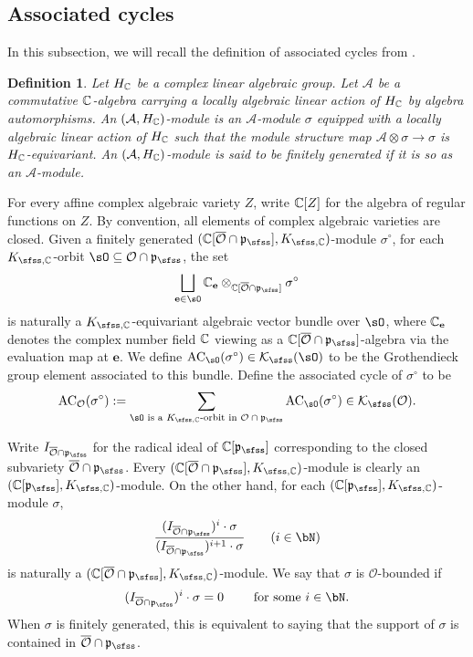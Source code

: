 \documentclass[11pt,a4paper]{amsart}
\newcommand{\CA}{{\mathcal {A}}}
\newcommand{\CK}{{\mathcal {K}}}
\newcommand{\CO}{{\mathcal {O}}}
\newcommand{\p}{\mathfrak p}
\numberwithin{equation}{section}
\newtheorem{defn}[thm]{Definition}
\theoremstyle{remark}
\def\subset{\subseteq}
\begin{document}
\subsection{Associated cycles}

In this subsection, we will recall the definition of associated cycles from \cite{Vo89}.
\begin{defn}\label{spkmodule}
 Let $H_{\mathbb{C}}$ be a complex linear algebraic group. Let $\CA$ be a commutative $\mathbb{C}$-algebra carrying a locally algebraic linear action of $H_{\mathbb{C}}$ by algebra automorphisms.
  An $(\CA, H_\C)$-module is an  $\CA$-module
$
  \sigma
$
equipped with a locally algebraic linear action of $H_{\mathbb{C}}$ such that
the module structure map
$
  \CA\otimes \sigma\rightarrow \sigma
$
is $H_{\mathbb{C}}$-equivariant. An $(\CA, H_\C)$-module is said to be finitely generated if it is so as an $\CA$-module.

\end{defn}

For every affine complex algebraic variety $Z$, write $\mathbb{C}[Z]$ for the algebra of regular functions on $Z$. By convention, all elements of complex algebraic varieties are closed.
Given a finitely generated $(\C[\overline \CO\cap \p_\sfss], K_{\sfss, \C})$-module $\sigma^\circ$, for each $K_{\sfss, \C}$-orbit $\sO\subset \CO\cap \p_\sfss$, the set
\[
  \bigsqcup_{\mathbf e\in \sO} \C_\mathbf e\otimes_{\C[\overline \CO\cap \p_\sfss]}\sigma^\circ
\]
is naturally a $K_{\sfss, \C}$-equivariant algebraic vector bundle over $\sO$, where $\mathbb{C}_\mathbf e$  denotes the complex number field $\mathbb{C}$ viewing as a $\C[\overline \CO\cap \p_\sfss]$-algebra via the evaluation map at $\mathbf e$. We define $\mathrm{AC}_\sO(\sigma^\circ)\in \CK_\sfss(\sO)$ to be the Grothendieck group element associated to this bundle. Define the  associated cycle of $\sigma^\circ$ to be
\[
  \mathrm{AC}_\CO(\sigma^\circ):=\sum_{\sO\textrm{ is a   $K_{\sfss, \C}$-orbit in $ \CO\cap \p_\sfss$}} \mathrm{AC}_\sO(\sigma^\circ)\in \CK_\sfss(\CO).
\]


Write $I_{\overline \CO\cap \p_\sfss}$ for the radical ideal of $\C[\p_\sfss]$ corresponding to the closed subvariety $\overline \CO\cap \p_\sfss$.
Every $(\C[\overline \CO\cap \p_\sfss], K_{\sfss, \C})$-module is clearly an $(\C[\p_\sfss], K_{\sfss,\C})$-module.
On the other hand, for each  $(\C[\p_{\sfss}], K_{\sfss, \C})$-module $\sigma$,
\[
  \frac{(I_{\overline \CO\cap \p_\sfss})^i\cdot \sigma}{(I_{\overline \CO\cap \p_\sfss})^{i+1}\cdot \sigma}\qquad (i\in \bN)
\]
is naturally a $(\C[\overline \CO\cap \p_\sfss], K_{\sfss, \C})$-module.
We say that $\sigma$ is $\CO$-bounded if
\[
(I_{\overline \CO\cap \p_\sfss})^i \cdot\sigma=0\qquad
\textrm{
for some $i\in \bN$.}
\]
When $\sigma$ is finitely generated, this is equivalent to saying that  the support of $\sigma$ is contained in $\overline{\CO}\cap \p_\sfss$.
\end{document}
